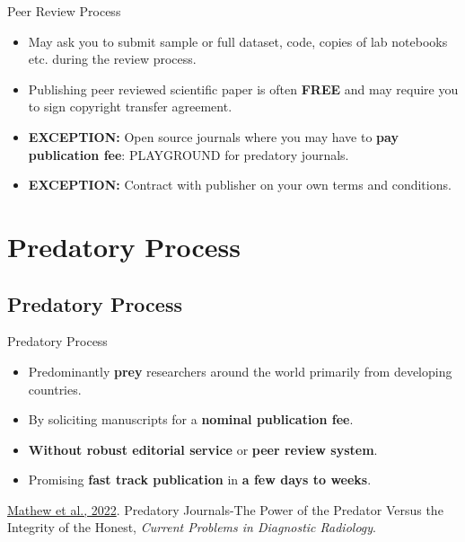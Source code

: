 \documentclass[11pt]{beamer}
\begin{document}
\begin{frame}{Peer Review Process}
\begin{itemize}
    \item May ask you to submit sample or full dataset, code, copies of lab notebooks etc. during the review process.
    \vspace{0.10 cm}
    
    \item Publishing peer reviewed scientific paper is often {\color{magenta}\textbf{FREE}} and may require you to sign copyright transfer agreement.
    \vspace{0.10 cm}
    
    \item {\color{red}\textbf{EXCEPTION:}} Open source journals where you may have to {\color{brown}\textbf{pay publication fee}}: {\color{green}PLAYGROUND} for predatory journals.
    \vspace{0.10 cm}
    
    \item {\color{red}\textbf{EXCEPTION:}} Contract with publisher on your own terms and conditions.
\end{itemize}
\end{frame}

\section{Predatory Process}
\subsection{Predatory Process}
\begin{frame}{Predatory Process}
\begin{itemize}
	\smallskip
	\item Predominantly \textbf{prey} researchers around the world primarily from developing countries.
	\smallskip
	\item By soliciting manuscripts for a \textbf{nominal publication fee}.
	\smallskip
	\item \textbf{Without robust editorial service} or \textbf{peer review system}. 
	\smallskip
	\item Promising \textbf{fast track publication} in \textbf{a few days to weeks}.
    \smallskip
\end{itemize}
    {\color{blue}\href{https://www.sciencedirect.com/science/article/pii/S0363018821001389}{Mathew et al., 2022}}. Predatory Journals-The Power of the Predator Versus the Integrity of the Honest, \textit{Current Problems in Diagnostic Radiology}.
\end{frame}
\end{document}
